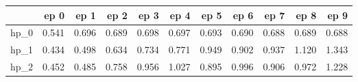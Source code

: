 \begin{tabular}{lrrrrrrrrrr}
\toprule
{} &   ep 0 &   ep 1 &   ep 2 &   ep 3 &   ep 4 &   ep 5 &   ep 6 &   ep 7 &   ep 8 &   ep 9 \\
\midrule
hp\_0 &  0.541 &  0.696 &  0.689 &  0.698 &  0.697 &  0.693 &  0.690 &  0.688 &  0.689 &  0.688 \\
hp\_1 &  0.434 &  0.498 &  0.634 &  0.734 &  0.771 &  0.949 &  0.902 &  0.937 &  1.120 &  1.343 \\
hp\_2 &  0.452 &  0.485 &  0.758 &  0.956 &  1.027 &  0.895 &  0.996 &  0.906 &  0.972 &  1.228 \\
\bottomrule
\end{tabular}

